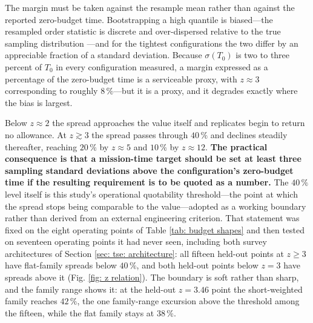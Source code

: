 \documentclass[12pt,a4paper]{article}
\numberwithin{equation}{section}
\numberwithin{figure}{section}
\numberwithin{table}{section}
\begin{document}
The margin must be taken against the resample mean rather than against the reported zero-budget time. Bootstrapping a high quantile is biased---the resampled order statistic is discrete and over-dispersed relative to the true sampling distribution \cite{falkkaufmann1991, bickelfreedman1981}---and for the tightest configurations the two differ by an appreciable fraction of a standard deviation. Because $\sigma(T_0)$ is two to three percent of $T_0$ in every configuration measured, a margin expressed as a percentage of the zero-budget time is a serviceable proxy, with $z\approx3$ corresponding to roughly $8\,\%$---but it is a proxy, and it degrades exactly where the bias is largest.

Below $z\approx2$ the spread approaches the value itself and replicates begin to return no allowance. At $z\gtrsim3$ the spread passes through $40\,\%$ and declines steadily thereafter, reaching $20\,\%$ by $z\approx5$ and $10\,\%$ by $z\approx12$. \textbf{The practical consequence is that a mission-time target should be set at least three sampling standard deviations above the configuration's zero-budget time if the resulting requirement is to be quoted as a number.} The $40\,\%$ level itself is this study's operational quotability threshold---the point at which the spread stops being comparable to the value---adopted as a working boundary rather than derived from an external engineering criterion. That statement was fixed on the eight operating points of Table \ref{tab: budget shapes} and then tested on seventeen operating points it had never seen, including both survey architectures of Section \ref{sec: tse: architecture}: all fifteen held-out points at $z\geq3$ have flat-family spreads below $40\,\%$, and both held-out points below $z=3$ have spreads above it (Fig. \ref{fig: z relation}). The boundary is soft rather than sharp, and the family range shows it: at the held-out $z=3.46$ point the short-weighted family reaches $42\,\%$, the one family-range excursion above the threshold among the fifteen, while the flat family stays at $38\,\%$.
\end{document}
